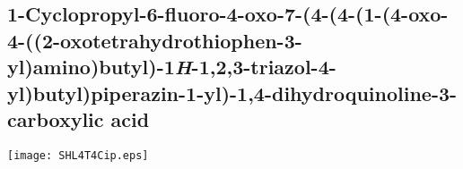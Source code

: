 \subsection{1\hyp{}Cyclopropyl\hyp{}6\hyp{}fluoro\hyp{}4\hyp{}oxo\hyp{}7\hyp{}(4\hyp{}(4\hyp{}(1\hyp{}(4\hyp{}oxo\hyp{}4\hyp{}((2\hyp{}oxotetrahydrothiophen\hyp{}3\hyp{}yl)amino)butyl)\hyp{}1\textit{H}\hyp{}1,2,3\hyp{}triazol\hyp{}4\hyp{}yl)butyl)piperazin\hyp{}1\hyp{}yl)\hyp{}1,4\hyp{}dihydroquin\allowbreak oline\hyp{}3\hyp{}carboxylic acid }


\begin{scheme}[H]
	\begin{center}
		\texttt{[image: SHL4T4Cip.eps]}
	\end{center}
\end{scheme}

